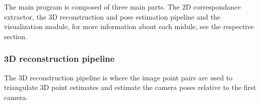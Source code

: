 The main program is composed of three main parts. The 2D correspondance extractor, the 3D reconstruction and pose estimation pipeline and the visualization module, for more information about each midule, see the respective section.


\subsubsection{3D reconstruction pipeline}
The 3D reconstruction pipeline is where the image point pairs are used to triangulate 3D point estimates and estimate the camera poses relative to the first camera. 